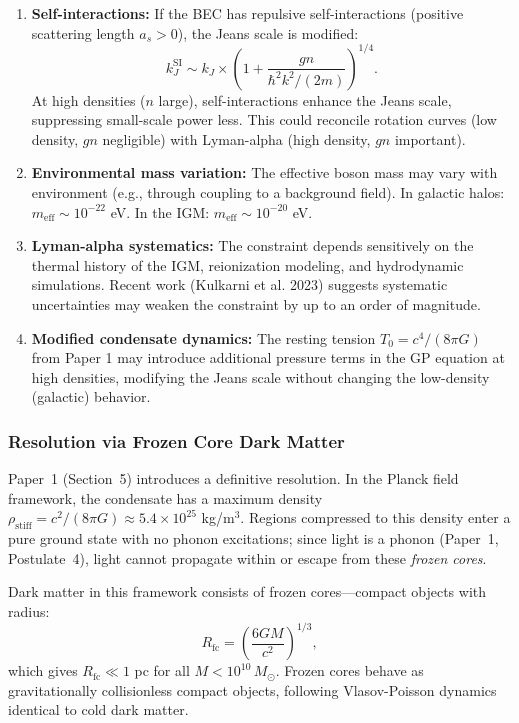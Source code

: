 \documentclass[11pt,a4paper]{article}
\newcommand{\rhostiff}{\ensuremath{\rho_{\mathrm{stiff}}}}
\newcommand{\Tzero}{\ensuremath{T_0}}
\theoremstyle{definition}
\theoremstyle{remark}
\begin{document}
\begin{enumerate}[leftmargin=*, itemsep=0.5em]
\item \textbf{Self-interactions:} If the BEC has repulsive self-interactions (positive scattering length $a_s > 0$), the Jeans scale is modified:
\begin{equation}
k_J^{\mathrm{SI}} \sim k_J \times \left(1 + \frac{g n}{\hbar^2 k^2/(2m)}\right)^{1/4}.
\end{equation}
At high densities ($n$ large), self-interactions enhance the Jeans scale, suppressing small-scale power less. This could reconcile rotation curves (low density, $g n$ negligible) with Lyman-alpha (high density, $g n$ important).

\item \textbf{Environmental mass variation:} The effective boson mass may vary with environment (e.g., through coupling to a background field). In galactic halos: $m_{\mathrm{eff}} \sim 10^{-22}$ eV. In the IGM: $m_{\mathrm{eff}} \sim 10^{-20}$ eV.

\item \textbf{Lyman-alpha systematics:} The constraint depends sensitively on the thermal history of the IGM, reionization modeling, and hydrodynamic simulations. Recent work (Kulkarni et al. 2023) suggests systematic uncertainties may weaken the constraint by up to an order of magnitude.

\item \textbf{Modified condensate dynamics:} The resting tension $\Tzero = c^4/(8\pi G)$ from Paper 1 \cite{Paper1} may introduce additional pressure terms in the GP equation at high densities, modifying the Jeans scale without changing the low-density (galactic) behavior.
\end{enumerate}

\subsubsection{Resolution via Frozen Core Dark Matter}
\label{sec:frozen_core_resolution}

Paper~1 (Section~5) introduces a definitive resolution. In the Planck field framework, the condensate has a maximum density $\rhostiff = c^2/(8\pi G) \approx 5.4 \times 10^{25}$ kg/m$^3$. Regions compressed to this density enter a pure ground state with no phonon excitations; since light is a phonon (Paper~1, Postulate~4), light cannot propagate within or escape from these \emph{frozen cores}.

Dark matter in this framework consists of frozen cores---compact objects with radius:
\begin{equation}
R_{\mathrm{fc}} = \left(\frac{6GM}{c^2}\right)^{1/3},
\end{equation}
which gives $R_{\mathrm{fc}} \ll 1$ pc for all $M < 10^{10}\,M_\odot$. Frozen cores behave as gravitationally collisionless compact objects, following Vlasov-Poisson dynamics identical to cold dark matter.
\end{document}
